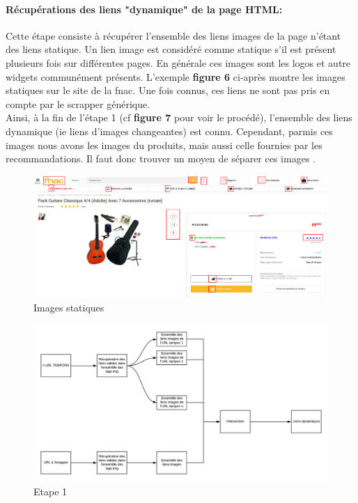 \documentclass{article} %
\begin{document}
\paragraph{Récupérations des liens "dynamique" de la page HTML:\\}
Cette étape consiste à récupérer l'ensemble des liens images de la page n'étant des liens statique. Un lien image est considéré comme statique s'il est présent plusieurs fois sur différentes pages. En générale ces images sont les logos et autre widgets communément présents. L'exemple \textbf{figure 6} ci-après montre les images statiques sur le site de la fnac. Une fois connus, ces liens ne sont pas pris en compte par le scrapper générique.\\ 
Ainsi, à la fin de l'étape 1 (cf \textbf{figure 7} pour voir le procédé), l'ensemble des liens dynamique (ie liens d'images changeantes) est connu. Cependant, parmis ces images nous avons les images du produits, mais aussi celle fournies par les recommandations. Il faut donc trouver un moyen de séparer ces images .

\begin{figure}[!h]
	\centering
	\includegraphics[keepaspectratio = true,scale=0.25]{static.png}
	\caption{Images statiques}
\end{figure}

 
\begin{figure}[!h]
	\centering
	\includegraphics[keepaspectratio = true,scale=0.4]{step1.png}
	\caption{Etape 1}
\end{figure}
\end{document}
